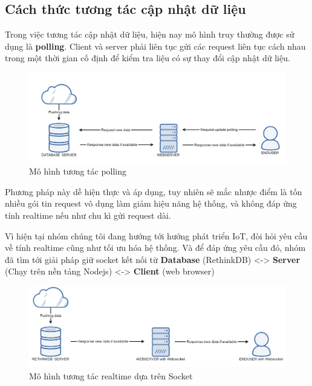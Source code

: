 \subsection{Cách thức tương tác cập nhật dữ liệu}

Trong việc tương tác cập nhật dữ liệu, hiện nay mô hình truy thường được sử dụng là \textbf{polling}. Client và server phải liên tục gửi các request liên tục cách nhau trong một thời gian cố định để kiểm tra liệu có sự thay đổi cập nhật dữ liệu. 
\begin{figure}[H]
	\centering    
	\includegraphics[width=1.0\textwidth]{polling}
	\caption[Mô hình tương tác polling]{Mô hình tương tác polling}
	\label{fig: polling}
\end{figure}
Phương pháp này dễ hiện thực và áp dụng, tuy nhiên sẽ mắc nhược điểm là tốn nhiều gói tin request vô dụng làm giảm hiệu năng hệ thống, và không đáp ứng tính realtime nếu như chu kì gửi request dài.



Vì hiện tại nhóm chúng tôi đang hướng tới hướng phát triển IoT, đòi hỏi yêu cầu về tính realtime cũng như tối ưu hóa hệ thống. Và để đáp ứng yêu cầu đó, nhóm đã tìm tới giải pháp giữ socket kết nối từ \textbf{Database} (RethinkDB) <-> \textbf{Server} (Chạy trên nền tảng Nodejs) <-> \textbf{Client} (web browser)

\begin{figure}[H]
	\centering    
	\includegraphics[width=1.0\textwidth]{realtime}
	\caption[Mô hình tương tác realtime dựa trên Socket]{Mô hình tương tác realtime dựa trên Socket}
	\label{fig: realtime}
\end{figure}


